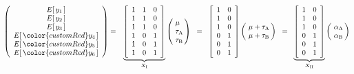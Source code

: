 \begin{minipage}{4in}
{\tiny
\begin{eqnarray*}
\left(\begin{array}{c}
	E\!\left[\,y_{1}\,\right] \\ E\!\left[\,y_{2}\,\right] \\ E\!\left[\,y_{3}\,\right] \\
	E\!\left[\,{\color{customRed}y_{4}}\,\right] \\ E\!\left[\,{\color{customRed}y_{5}}\,\right] \\ E\!\left[\,{\color{customRed}y_{6}}\,\right]
	\end{array}\right)
&=&
\underset{X_{\textnormal{I}}}{\underbrace{\left[\begin{array}{cccc}
	1&1&0\\
	1&1&0\\
	1&1&0\\
	1&0&1\\
	1&0&1\\
	1&0&1
\end{array}\right]}}
\left(\!\begin{array}{l} \mu \\ \tau_{\textnormal{A}} \\ \tau_{\textnormal{B}} \end{array}\!\!\right)
\;\;=\;\;
\left[\begin{array}{cccc}
	1&0\\
	1&0\\
	1&0\\
	0&1\\
	0&1\\
	0&1
\end{array}\right]
\left(\!\begin{array}{l} \mu + \tau_{\textnormal{A}} \\ \mu + \tau_{\textnormal{B}} \end{array}\!\!\right)
\;\;=\;\;
\underset{X_{\textnormal{II}}}{\underbrace{\left[\begin{array}{cccc}
	1&0\\
	1&0\\
	1&0\\
	0&1\\
	0&1\\
	0&1
\end{array}\right]}}
\left(\!\begin{array}{l} \alpha_{\textnormal{A}} \\ \alpha_{\textnormal{B}} \end{array}\!\!\right)
\end{eqnarray*}
}
\end{minipage}
